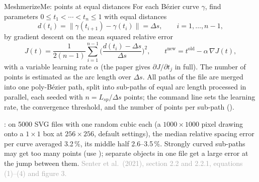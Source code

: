 \documentclass[aspectratio=169,11pt]{beamer}
\newcommand{\sourcecredit}[1]{\vfill\hfill{\tiny\textcolor{DarkGray}{#1}}}
\begin{document}
\begin{frame}{MeshmerizeMe: points at equal distances}
\label{fr:mm}
\footnotesize
For each B\'ezier curve $\gamma$, find parameters $0 \le t_1 < \cdots < t_n \le 1$ with equal  distances
\[ d(t_i) = \|\gamma(t_{i+1}) - \gamma(t_i)\| = \Delta s, \qquad i = 1, \ldots, n - 1, \]
by gradient descent on the mean squared relative error
\[ J(t) = \frac{1}{2(n-1)} \sum_{i=1}^{n-1} \Big( \frac{d(t_i) - \Delta s}{\Delta s} \Big)^2, \qquad t^{\text{new}} = t^{\text{old}} - \alpha\,\nabla J(t), \]
with a variable learning rate $\alpha$ (the paper gives $\partial J/\partial t_j$ in full). The number of points is estimated as the arc length over $\Delta s$. All paths of the file are merged into one poly-B\'ezier path, split into sub-paths of equal arc length processed in parallel, each seeded with $n = L_{sp}/\Delta s$ points; the command line sets the learning rate, the convergence threshold, and the number of points per sub-path ().

: on 5000 SVG files with one random cubic each (a $1000 \times 1000$ pixel drawing onto a $1 \times 1$ box at $256 \times 256$, default settings), the median relative spacing error per curve averaged 3.2\,\%, its middle half 2.6--3.5\,\%. Strongly curved sub-paths may get too many points (use ); separate objects in one file get a large error at the jump between them.
\sourcecredit{Senter et al.\ (2021), section 2.2 and 2.2.1, equations (1)--(4) and figure 3.}
\end{frame}
\end{document}
